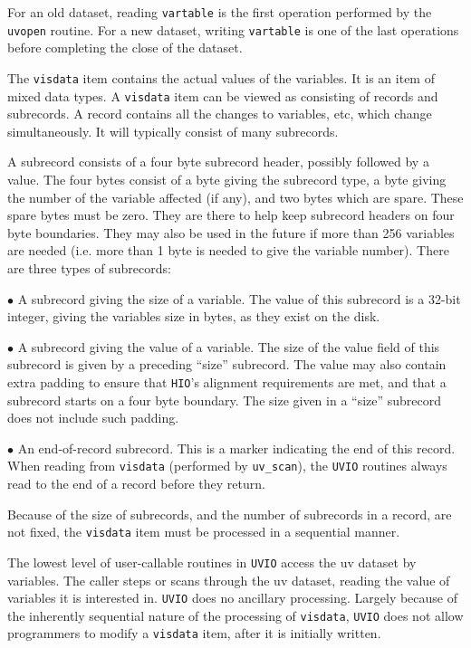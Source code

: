 For an old dataset, reading {\tt vartable} is the first operation performed
by the {\tt uvopen} routine. For a new dataset, writing {\tt vartable}
is one of the last operations before completing the close of the dataset.


The {\tt visdata} item contains the actual values of the variables. It is
an item of mixed data types. A {\tt visdata} item can be viewed as consisting
of records and subrecords. A record contains all the changes to variables,
etc, which change simultaneously. It will typically consist of many subrecords.

A subrecord consists of a four byte subrecord header,
possibly followed by a value. The four bytes consist of a byte giving the
subrecord type, a byte giving the number of the variable affected (if
any), and two bytes which are spare. These spare bytes must be zero. They
are there to help keep subrecord headers on
four byte boundaries. They may also be used in the future if more than 256
variables are needed (i.e. more than 1 byte is needed to give the
variable number). There are three types of subrecords:

\item{$\bullet$} A subrecord giving the size of a variable. The
value of this subrecord is a 32-bit integer, giving the variables
size in bytes, as they exist on the disk.
\item{$\bullet$} A subrecord giving the value of a variable. The size of the
value field of this subrecord is given by a preceding ``size'' subrecord.
The value may also contain extra padding to ensure that {\tt HIO}'s
alignment requirements are met, and that a subrecord starts on a four byte
boundary. The size given in a ``size'' subrecord does not include such padding.
\item{$\bullet$} An end-of-record subrecord. This is a marker indicating the
end of this record. When reading from {\tt visdata} (performed by
{\tt uv\_scan}), the {\tt UVIO} routines always read to the end of a record
before they return.

Because of the size of subrecords, and the number of subrecords in a 
record, are not fixed, the {\tt visdata} item must be processed in a sequential
manner.


The lowest level of user-callable routines in {\tt UVIO} access the uv dataset
by variables. The caller steps or scans through the uv dataset, reading the
value of variables it is interested in. {\tt UVIO} does no ancillary
processing. Largely because of the inherently sequential nature of the
processing of {\tt visdata}, {\tt UVIO} does not allow programmers to
modify a {\tt visdata} item, after it is initially written.

